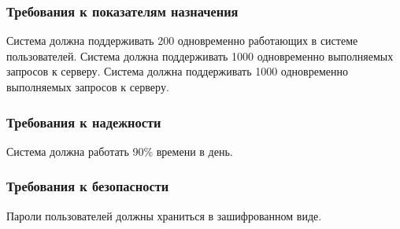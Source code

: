 \subsubsection{Требования к показателям назначения}
Система должна поддерживать 200 одновременно работающих в системе пользователей.
Система должна поддерживать 1000 одновременно выполняемых запросов к серверу.
Система должна поддерживать 1000 одновременно выполняемых запросов к серверу.

\subsubsection{Требования к надежности}
Система должна работать 90\% времени в день.

\subsubsection{Требования к безопасности}
Пароли пользователей должны храниться в зашифрованном виде.
